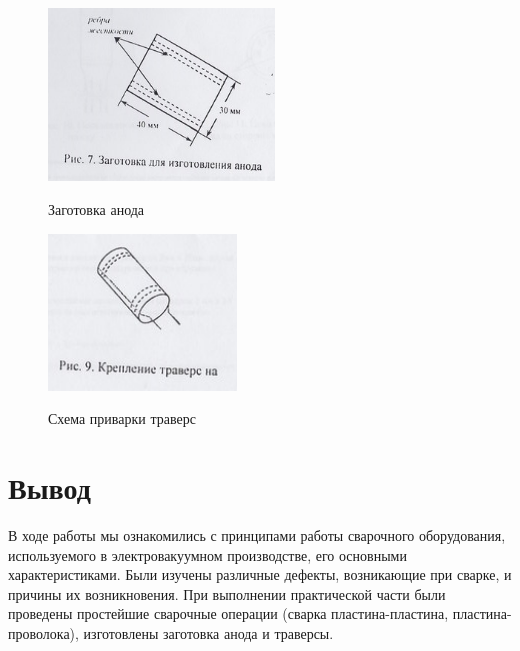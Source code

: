 \documentclass[12pt]{article}
\begin{document}
\begin{figure}[h]
\begin{multicols}{2}
\hfill
\includegraphics[width=60mm]{anode.png}
\hfill
\caption{Заготовка анода}
\label{figLeft}
\hfill
\includegraphics[width=50mm]{trav.png}
\hfill
\caption{Схема приварки траверс}
\label{figRight}
\end{multicols}
\end{figure}

\section{Вывод}
В ходе работы мы ознакомились с принципами работы сварочного оборудования, используемого в электровакуумном производстве, его основными характеристиками. Были изучены различные дефекты, возникающие при сварке, и причины их возникновения. При выполнении практической части были проведены простейшие сварочные операции (сварка пластина-пластина, пластина-проволока), изготовлены заготовка анода и траверсы.
\end{document}

